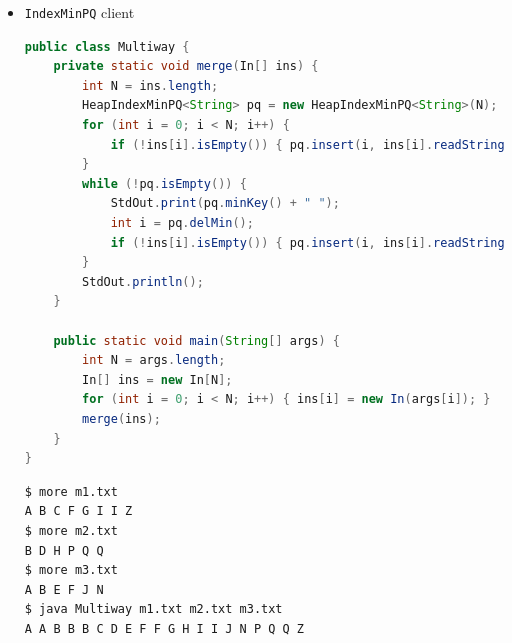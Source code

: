\documentclass[8pt,a4paper,compress]{beamer}
\begin{document}
\begin{frame}[fragile]
\begin{itemize}
\item \lstinline{IndexMinPQ} client
\begin{lstlisting}[language=Java]
public class Multiway { 
    private static void merge(In[] ins) { 
        int N = ins.length; 
        HeapIndexMinPQ<String> pq = new HeapIndexMinPQ<String>(N); 
        for (int i = 0; i < N; i++) { 
            if (!ins[i].isEmpty()) { pq.insert(i, ins[i].readString()); }
        } 
        while (!pq.isEmpty()) {
            StdOut.print(pq.minKey() + " "); 
            int i = pq.delMin(); 
            if (!ins[i].isEmpty()) { pq.insert(i, ins[i].readString()); }
        }
        StdOut.println();
    } 

    public static void main(String[] args) { 
        int N = args.length; 
        In[] ins = new In[N]; 
        for (int i = 0; i < N; i++) { ins[i] = new In(args[i]); } 
        merge(ins); 
    } 
} 
\end{lstlisting}

\begin{lstlisting}[language={}]
$ more m1.txt 
A B C F G I I Z
$ more m2.txt 
B D H P Q Q
$ more m3.txt 
A B E F J N
$ java Multiway m1.txt m2.txt m3.txt 
A A B B B C D E F F G H I I J N P Q Q Z 
\end{lstlisting}
\end{itemize}
\end{frame}
\end{document}
